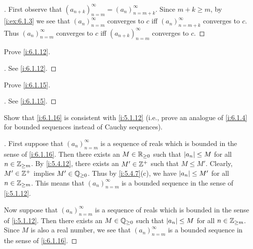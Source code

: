 \begin{proof}[]
  First observe that \((a_{n + k})_{n = m}^\infty = (a_n)_{n = m + k}^\infty\).
  Since \(m + k \geq m\), by \cref{i:ex:6.1.3} we see that \((a_n)_{n = m}^\infty\) converges to \(c\) iff \((a_n)_{n = m + k}^\infty\) converges to \(c\).
  Thus \((a_n)_{n = m}^\infty\) converges to \(c\) iff \((a_{n + k})_{n = m}^\infty\) converges to \(c\).
\end{proof}

\begin{ex}\label{i:ex:6.1.5}
  Prove \cref{i:6.1.12}.
\end{ex}

\begin{proof}[]
  See \cref{i:6.1.12}.
\end{proof}

\begin{ex}\label{i:ex:6.1.6}
  Prove \cref{i:6.1.15}.
\end{ex}

\begin{proof}[]
  See \cref{i:6.1.15}.
\end{proof}

\begin{ex}\label{i:ex:6.1.7}
  Show that \cref{i:6.1.16} is consistent with \cref{i:5.1.12}
  (i.e., prove an analogue of \cref{i:6.1.4} for bounded sequences instead of Cauchy sequences).
\end{ex}

\begin{proof}[]
  First suppose that \((a_n)_{n = m}^\infty\) is a sequence of reals which is bounded in the sense of \cref{i:6.1.16}.
  Then there exists an \(M \in \mathbb{R}_{\geq 0}\) such that \(\left\lvert a_n\right\rvert \leq M\) for all \(n \in \mathbb{Z}_{\geq m}\).
  By \cref{i:5.4.12}, there exists an \(M' \in \mathbb{Z}^+\) such that \(M \leq M'\).
  Clearly, \(M' \in \mathbb{Z}^+\) implies \(M' \in \mathbb{Q}_{\geq 0}\).
  Thus by \cref{i:5.4.7}(c), we have \(\left\lvert a_n\right\rvert \leq M'\) for all \(n \in \mathbb{Z}_{\geq m}\).
  This means that \((a_n)_{n = m}^\infty\) is a bounded sequence in the sense of \cref{i:5.1.12}.

  Now suppose that \((a_n)_{n = m}^\infty\) is a sequence of reals which is bounded in the sense of \cref{i:5.1.12}.
  Then there exists an \(M \in \mathbb{Q}_{\geq 0}\) such that \(\left\lvert a_n\right\rvert \leq M\) for all \(n \in \mathbb{Z}_{\geq m}\).
  Since \(M\) is also a real number, we see that \((a_n)_{n = m}^\infty\) is a bounded sequence in the sense of \cref{i:6.1.16}.
\end{proof}


